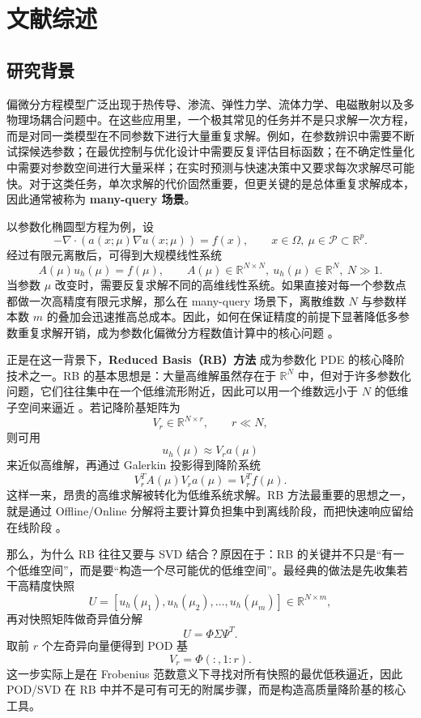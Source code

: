 \section{文献综述}

\subsection{研究背景}

偏微分方程模型广泛出现于热传导、渗流、弹性力学、流体力学、电磁散射以及多物理场耦合问题中。在这些应用里，一个极其常见的任务并不是只求解一次方程，而是对同一类模型在不同参数下进行大量重复求解。例如，在参数辨识中需要不断试探候选参数；在最优控制与优化设计中需要反复评估目标函数；在不确定性量化中需要对参数空间进行大量采样；在实时预测与快速决策中又要求每次求解尽可能快。对于这类任务，单次求解的代价固然重要，但更关键的是总体重复求解成本，因此通常被称为 \textbf{many-query 场景}。

以参数化椭圆型方程为例，设
\[
-\nabla\cdot(a(x;\mu)\nabla u(x;\mu)) = f(x),\qquad x\in\Omega,\ \mu\in\mathcal P\subset\mathbb R^p .
\]
经过有限元离散后，可得到大规模线性系统
\[
A(\mu)u_h(\mu)=f(\mu),\qquad A(\mu)\in\mathbb R^{N\times N},\ u_h(\mu)\in\mathbb R^N,\ N\gg 1.
\]
当参数 $\mu$ 改变时，需要反复求解不同的高维线性系统。如果直接对每一个参数点都做一次高精度有限元求解，那么在 many-query 场景下，离散维数 $N$ 与参数样本数 $m$ 的叠加会迅速推高总成本。因此，如何在保证精度的前提下显著降低多参数重复求解开销，成为参数化偏微分方程数值计算中的核心问题 。

正是在这一背景下，\textbf{Reduced Basis（RB）方法} 成为参数化 PDE 的核心降阶技术之一。RB 的基本思想是：大量高维解虽然存在于 $\mathbb R^N$ 中，但对于许多参数化问题，它们往往集中在一个低维流形附近，因此可以用一个维数远小于 $N$ 的低维子空间来逼近 \cite{hesthaven2015,patera_rozza}。若记降阶基矩阵为
\[
V_r\in\mathbb R^{N\times r},\qquad r\ll N,
\]
则可用
\[
u_h(\mu)\approx V_r a(\mu)
\]
来近似高维解，再通过 Galerkin 投影得到降阶系统
\[
V_r^T A(\mu)V_r a(\mu)=V_r^T f(\mu).
\]
这样一来，昂贵的高维求解被转化为低维系统求解。RB 方法最重要的思想之一，就是通过 Offline/Online 分解将主要计算负担集中到离线阶段，而把快速响应留给在线阶段 \cite{hesthaven2015,patera_rozza}。

那么，为什么 RB 往往又要与 SVD 结合？原因在于：RB 的关键并不只是“有一个低维空间”，而是要“构造一个尽可能优的低维空间”。最经典的做法是先收集若干高精度快照
\[
U=[u_h(\mu_1),u_h(\mu_2),\dots,u_h(\mu_m)]\in\mathbb R^{N\times m},
\]
再对快照矩阵做奇异值分解
\[
U=\Phi\Sigma\Psi^T.
\]
取前 $r$ 个左奇异向量便得到 POD 基
\[
V_r=\Phi(:,1:r).
\]
这一步实际上是在 Frobenius 范数意义下寻找对所有快照的最优低秩逼近，因此 POD/SVD 在 RB 中并不是可有可无的附属步骤，而是构造高质量降阶基的核心工具。

